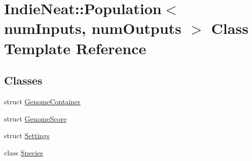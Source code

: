 \hypertarget{class_indie_neat_1_1_population}{}\section{Indie\+Neat\+:\+:Population$<$ num\+Inputs, num\+Outputs $>$ Class Template Reference}
\label{class_indie_neat_1_1_population}
\subsection*{Classes}
\begin{DoxyCompactItemize}
\item 
struct \hyperlink{struct_indie_neat_1_1_population_1_1_genome_container}{Genome\+Container}
\item 
struct \hyperlink{struct_indie_neat_1_1_population_1_1_genome_score}{Genome\+Score}
\item 
struct \hyperlink{struct_indie_neat_1_1_population_1_1_settings}{Settings}
\item 
class \hyperlink{class_indie_neat_1_1_population_1_1_species}{Species}
\end{DoxyCompactItemize}
